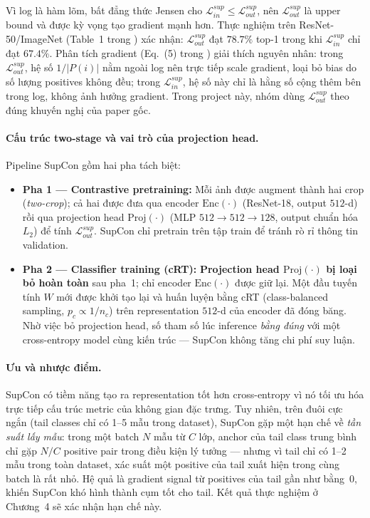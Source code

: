 Vì log là hàm lõm, bất đẳng thức Jensen cho
$\mathcal{L}^{sup}_{in} \leq \mathcal{L}^{sup}_{out}$,
nên $\mathcal{L}^{sup}_{out}$ là upper bound và được kỳ vọng tạo gradient
mạnh hơn.
Thực nghiệm trên ResNet-50/ImageNet (Table~1 trong \cite{khosla2020supcon})
xác nhận: $\mathcal{L}^{sup}_{out}$ đạt $78.7\%$ top-1
trong khi $\mathcal{L}^{sup}_{in}$ chỉ đạt $67.4\%$.
Phân tích gradient (Eq.~(5) trong \cite{khosla2020supcon}) giải thích
nguyên nhân: trong $\mathcal{L}^{sup}_{out}$, hệ số $1/|P(i)|$ nằm ngoài log
nên trực tiếp scale gradient, loại bỏ bias do số lượng positives không đều;
trong $\mathcal{L}^{sup}_{in}$, hệ số này chỉ là hằng số cộng thêm bên trong log,
không ảnh hưởng gradient.
Trong project này, nhóm dùng $\mathcal{L}^{sup}_{out}$ theo đúng khuyến nghị
của paper gốc.

\paragraph{Cấu trúc two-stage và vai trò của projection head.}
Pipeline SupCon gồm hai pha tách biệt:
\begin{itemize}
    \item \textbf{Pha 1 --- Contrastive pretraining:}
    Mỗi ảnh được augment thành hai crop (\emph{two-crop});
    cả hai được đưa qua encoder $\mathrm{Enc}(\cdot)$ (ResNet-18, output $512$-d)
    rồi qua projection head $\mathrm{Proj}(\cdot)$
    (MLP $512 \!\to\! 512 \!\to\! 128$, output chuẩn hóa $L_2$)
    để tính $\mathcal{L}^{sup}_{out}$.
    SupCon chỉ pretrain trên tập train để tránh rò rỉ thông tin validation.

    \item \textbf{Pha 2 --- Classifier training (cRT):}
    \textbf{Projection head $\mathrm{Proj}(\cdot)$ bị loại bỏ hoàn toàn}
    sau pha~1; chỉ encoder $\mathrm{Enc}(\cdot)$ được giữ lại.
    Một đầu tuyến tính $W$ mới được khởi tạo lại và huấn luyện bằng cRT
    (class-balanced sampling, $p_c \propto 1/n_c$) trên representation
    $512$-d của encoder đã đóng băng.
    Nhờ việc bỏ projection head, số tham số lúc inference
    \emph{bằng đúng} với một cross-entropy model cùng kiến trúc ---
    SupCon không tăng chi phí suy luận.
\end{itemize}

\paragraph{Ưu và nhược điểm.}
SupCon có tiềm năng tạo ra representation tốt hơn cross-entropy vì nó
tối ưu hóa trực tiếp cấu trúc metric của không gian đặc trưng.
Tuy nhiên, trên đuôi cực ngắn (tail classes chỉ có 1--5 mẫu trong dataset),
SupCon gặp một hạn chế về \emph{tần suất lấy mẫu}: trong một batch $N$ mẫu
từ $C$ lớp, anchor của tail class trung bình chỉ gặp $N/C$ positive pair
trong điều kiện lý tưởng --- nhưng vì tail chỉ có 1--2 mẫu trong toàn dataset,
xác suất một positive của tail xuất hiện trong cùng batch là rất nhỏ.
Hệ quả là gradient signal từ positives của tail gần như bằng~0,
khiến SupCon khó hình thành cụm tốt cho tail.
Kết quả thực nghiệm ở Chương~4 sẽ xác nhận hạn chế này.

